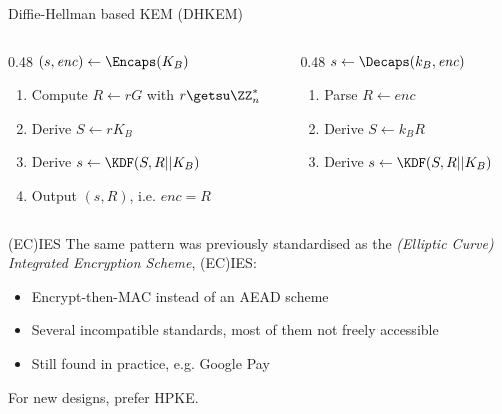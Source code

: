 \begin{frame}{Diffie-Hellman based KEM (DHKEM)}
  \begin{columns}[t]
    \begin{column}{0.48\textwidth}
      $(s, \mathit{enc})\gets\Encaps(K_B)$

      \vspace*{0.5em}

      \begin{enumerate}[<+(1)->]
        \item Compute $R\gets rG$ with $r\getsu\ZZ_n^*$
        \item Derive $S\gets rK_B$
        \item Derive $s\gets\KDF(S, R||K_B)$
        \item Output $(s, R)$, i.e. $\mathit{enc} = R$
      \end{enumerate}
    \end{column}
    \begin{column}{0.48\textwidth}
      \pause
      $s\gets\Decaps(k_B, \mathit{enc})$

      \vspace*{0.5em}

      \begin{enumerate}[<+(1)->]
        \item Parse $R\gets\mathit{enc}$
        \item Derive $S\gets k_BR$
        \item Derive $s\gets\KDF(S, R||K_B)$
      \end{enumerate}
    \end{column}
  \end{columns}

\end{frame}

\begin{frame}{(EC)IES}
  The same pattern was previously standardised as the \emph{(Elliptic Curve) Integrated Encryption Scheme}, (EC)IES:
  \begin{itemize}[<+(1)->]
    \item Encrypt-then-MAC instead of an AEAD scheme
    \item Several incompatible standards, most of them not freely accessible
    \item Still found in practice, e.g. Google Pay
  \end{itemize}

  \vspace*{1em}

  \pause
  For new designs, prefer HPKE.
\end{frame}


